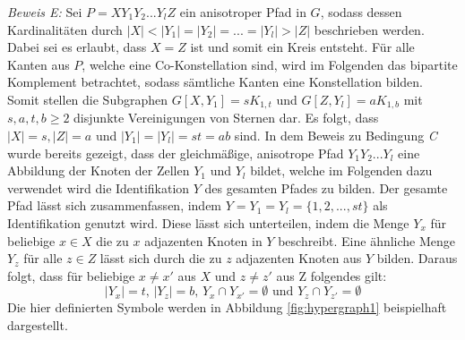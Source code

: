 \emph{Beweis E:} Sei $P=XY_1Y_2...Y_lZ$ ein anisotroper Pfad in $G$, sodass dessen Kardinalitäten durch $|X|<|Y_1|=|Y_2|=...=|Y_l|>|Z|$ beschrieben werden.
Dabei sei es erlaubt, dass $X=Z$ ist und somit ein Kreis entsteht.
Für alle Kanten aus $P$, welche eine Co-Konstellation sind, wird im Folgenden das bipartite Komplement betrachtet, sodass sämtliche Kanten eine Konstellation bilden.
Somit stellen die Subgraphen $G[X,Y_1]=sK_{1,t}$ und $G[Z,Y_l]=aK_{1,b}$ mit $s,a,t,b\geq 2$ disjunkte Vereinigungen von Sternen dar.
Es folgt, dass $|X|=s, |Z|=a$ und $|Y_1|=|Y_l|=st=ab$ sind.
In dem Beweis zu Bedingung \emph{C} wurde bereits gezeigt, dass der gleichmäßige, anisotrope Pfad $Y_1Y_2...Y_l$ eine Abbildung der Knoten der Zellen $Y_1$ und $Y_l$ bildet, welche im Folgenden dazu verwendet wird die Identifikation $Y$ des gesamten Pfades zu bilden.
Der gesamte Pfad lässt sich zusammenfassen, indem $Y=Y_1=Y_l=\{1,2,...,st\}$ als Identifikation genutzt wird.
Diese lässt sich unterteilen, indem die Menge $Y_x$ für beliebige $x\in X$ die zu $x$ adjazenten Knoten in $Y$ beschreibt.
Eine ähnliche Menge $Y_z$ für alle $z\in Z$ lässt sich durch die zu $z$ adjazenten Knoten aus $Y$ bilden.
Daraus folgt, dass für beliebige $x\neq x'$ aus $X$ und $z\neq z'$ aus Z folgendes gilt:
\begin{displaymath}
	|Y_x|=t\text{, }|Y_z|=b\text{, }Y_x\cap Y_{x'}=\emptyset \text{ und }Y_z\cap Y_{z'}=\emptyset
\end{displaymath}
Die hier definierten Symbole werden in Abbildung \ref{fig:hypergraph1} beispielhaft dargestellt.

